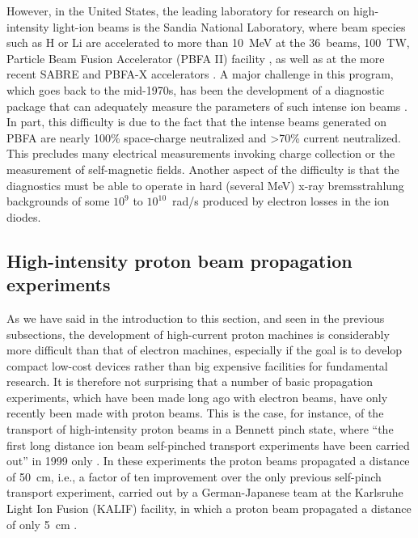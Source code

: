 \documentclass [12pt,a4paper,     ]{report} %
\begin{document}
   However, in the United States, the leading laboratory for research on high-intensity light-ion beams is the Sandia National Laboratory, where beam species such as H or Li are accelerated to more than 10~MeV at the 36~beams,  100~TW, Particle Beam Fusion Accelerator (PBFA II) facility \cite{JOHNS1989-}, as well as at the more recent SABRE and PBFA-X accelerators \cite{CUNEO1998-}.  A major challenge in this program, which goes back to the mid-1970s, has been the development of a diagnostic package that can adequately measure the parameters of such intense ion beams \cite{MCDAN1988-}. In part, this difficulty is due to the fact that the intense beams generated on PBFA are nearly 100\% space-charge neutralized and >70\% current neutralized. This precludes many electrical measurements invoking charge collection or the measurement of self-magnetic fields.  Another aspect of the difficulty is that the diagnostics must be able to operate in hard (several MeV) x-ray bremsstrahlung backgrounds of some $10^9$ to $10^{10}$~rad/s produced by electron losses in the ion diodes.  

\subsection{High-intensity proton beam propagation experiments}

  As we have said in the introduction to this section, and seen in the previous subsections, the development of high-current proton machines is considerably more difficult than that of electron machines, especially if the goal is to develop compact low-cost devices rather than big expensive facilities for fundamental research.  It is therefore not surprising that a number of basic propagation experiments, which have been made long ago with electron beams, have only recently been made with proton beams.  This is the case, for instance, of the transport of high-intensity proton beams in a Bennett pinch state, where ``the first long distance ion beam self-pinched transport experiments have been carried out'' in 1999 only \cite[p.356]{OTTIN2000-}.  In these experiments the proton beams propagated a distance of 50~cm, i.e., a factor of ten improvement over the only previous self-pinch transport experiment, carried out by a German-Japanese team at the Karlsruhe Light Ion Fusion (KALIF) facility, in which a proton beam propagated a distance of only 5~cm \cite{HOPPE1996-}.
\end{document}
